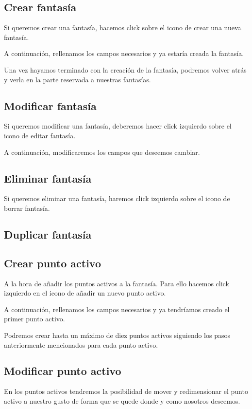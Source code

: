 \subsection{Crear fantasía}
Si queremos crear una fantasía, hacemos click sobre el icono de crear una nueva fantasía.

A continuación, rellenamos los campos necesarios y ya estaría creada la fantasía.

Una vez hayamos terminado con la creación de la fantasía, podremos volver atrás y verla en la parte reservada a nuestras fantasías.

\subsection{Modificar fantasía}
Si queremos modificar una fantasía, deberemos hacer click izquierdo sobre el icono de editar fantasía.

A continuación, modificaremos los campos que deseemos cambiar.

\subsection{Eliminar fantasía}
Si queremos eliminar una fantasía, haremos click izquierdo sobre el icono de borrar fantasía.

\subsection{Duplicar fantasía}


\subsection{Crear punto activo}
A la hora de añadir los puntos activos a la fantasía. Para ello hacemos click izquierdo en el icono de añadir un nuevo punto activo.

A continuación, rellenamos los campos necesarios y ya tendríamos creado el primer punto activo.

Podremos crear hasta un máximo de diez puntos activos siguiendo los pasos anteriormente mencionados para cada punto activo.


\subsection{Modificar punto activo}
En los puntos activos tendremos la posibilidad de mover y redimensionar el punto activo a nuestro gusto de forma que se quede donde y como nosotros deseemos.

